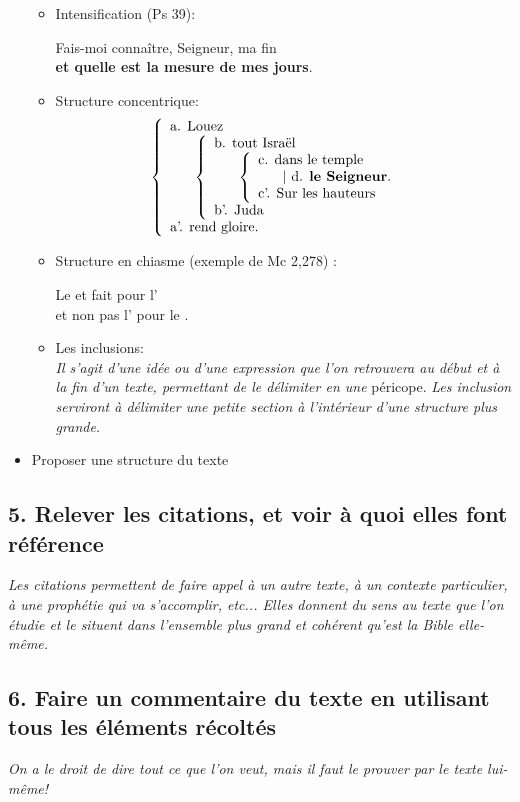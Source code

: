 \begin{itemize}[label=]
\begin{itemize}[label=]
\item Intensification (Ps 39):\\
\begin{siderules}Fais-moi connaître, Seigneur, ma fin \\
\textbf{et quelle est la mesure de mes jours}.\end{siderules}
\item Structure concentrique:\\
\[
\left\{ \begin{array}{ll} \text{a. Louez}\\
\hspace*{0.5cm}~
\left\{ \begin{array}{ll} \text{b. tout Israël}\\
\hspace*{0.5cm}~
\left\{ \begin{array}{ll} \text{c. dans le temple}\\
 \text{\hspace*{0.5cm}~| d. \textbf{le Seigneur}.}\\
\text{c'. Sur les hauteurs}
\end{array}
\right. \\
\text{b'. Juda}
\end{array}
\right.\\
\text{a'. rend gloire.}
\end{array}
\right.
\]
\item Structure en chiasme (exemple de Mc 2,278) :\\
\begin{siderules}Le  et fait pour l'\\
et non pas l' pour le . \end{siderules}
\item Les inclusions:\\
\textit{Il s'agit d'une idée ou d'une expression que l'on retrouvera au début et à la fin d'un texte, permettant de le délimiter en une} péricope. \textit{Les inclusion serviront à délimiter une petite section à l'intérieur d'une structure plus grande.}
\end{itemize}
\item Proposer une structure du texte
\end{itemize}
\subsection*{5. Relever les citations, et voir à quoi elles font référence}
\textit{Les citations permettent de faire appel à un autre texte, à un contexte particulier, à une prophétie qui va s'accomplir, etc... Elles donnent du sens au texte que l'on étudie et le situent dans l'ensemble plus grand et cohérent qu'est la Bible elle-même.}
\subsection*{6. Faire un commentaire du texte en utilisant tous les éléments récoltés}
\textit{On a le droit de dire tout ce que l'on veut, mais il faut le prouver par le texte lui-même!}
